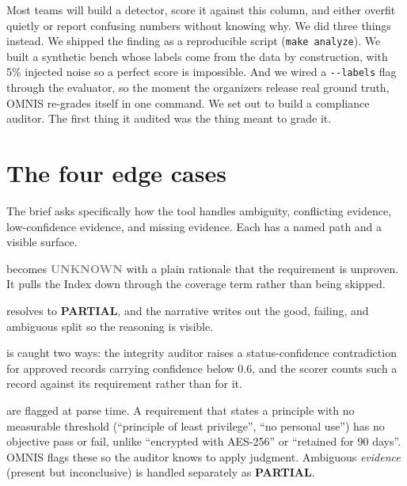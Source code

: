 \documentclass[11pt]{article}
\newcommand{\code}[1]{\texttt{\small #1}}
\newcommand{\chip}[2]{\textcolor{#1}{\sffamily\bfseries\footnotesize #2}}
\begin{document}
Most teams will build a detector, score it against this column, and either overfit quietly
or report confusing numbers without knowing why. We did three things instead. We shipped
the finding as a reproducible script (\code{make analyze}). We built a synthetic bench
whose labels come from the data by construction, with 5\% injected noise so a perfect
score is impossible. And we wired a \code{-{}-labels} flag through the evaluator, so the
moment the organizers release real ground truth, OMNIS re-grades itself in one command.
We set out to build a compliance auditor. The first thing it audited was the thing meant
to grade it.

\section{The four edge cases}\label{sec:edge}

The brief asks specifically how the tool handles ambiguity, conflicting evidence,
low-confidence evidence, and missing evidence. Each has a named path and a visible
surface.

\begin{description}[leftmargin=0pt,style=nextline,itemsep=3pt,labelsep=0pt]
\item[\textcolor{navy}{Missing evidence}] becomes \chip{grey}{UNKNOWN} with a plain
  rationale that the requirement is unproven. It pulls the Index down through the coverage
  term rather than being skipped.
\item[\textcolor{navy}{Conflicting evidence}] resolves to \chip{amber}{PARTIAL}, and the
  narrative writes out the good, failing, and ambiguous split so the reasoning is visible.
\item[\textcolor{navy}{Low-confidence evidence}] is caught two ways: the integrity auditor
  raises a status-confidence contradiction for approved records carrying confidence below
  0.6, and the scorer counts such a record against its requirement rather than for it.
\item[\textcolor{navy}{Ambiguous requirements}] are flagged at parse time. A requirement
  that states a principle with no measurable threshold (``principle of least privilege'',
  ``no personal use'') has no objective pass or fail, unlike ``encrypted with AES-256'' or
  ``retained for 90 days''. OMNIS flags these so the auditor knows to apply judgment.
  Ambiguous \emph{evidence} (present but inconclusive) is handled separately as
  \chip{amber}{PARTIAL}.
\end{description}
\end{document}
